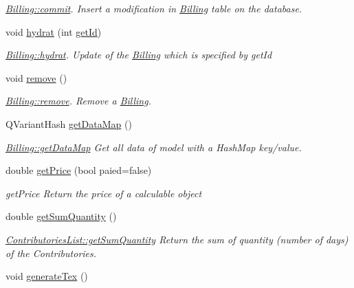\begin{DoxyCompactItemize}
\begin{DoxyCompactList}\small\item\em \hyperlink{classModels_1_1Billing_ad2280a0d8dde4c36e88c344b01044caf}{Billing\-::commit}. Insert a modification in \hyperlink{classModels_1_1Billing}{Billing} table on the database. \end{DoxyCompactList}\item 
void \hyperlink{classModels_1_1Billing_a689643008955fdcd5833631a6202c0dc}{hydrat} (int \hyperlink{classModels_1_1IModel_a63087bb34da8c38a11109cd775122d31}{get\-Id})
\begin{DoxyCompactList}\small\item\em \hyperlink{classModels_1_1Billing_a689643008955fdcd5833631a6202c0dc}{Billing\-::hydrat}. Update of the \hyperlink{classModels_1_1Billing}{Billing} which is specified by {\itshape get\-Id} \end{DoxyCompactList}\item 
\hypertarget{classModels_1_1Billing_ada8a7c127a80fa7349fbd6a7d30ca4a3}{void \hyperlink{classModels_1_1Billing_ada8a7c127a80fa7349fbd6a7d30ca4a3}{remove} ()}\label{classModels_1_1Billing_ada8a7c127a80fa7349fbd6a7d30ca4a3}

\begin{DoxyCompactList}\small\item\em \hyperlink{classModels_1_1Billing_ada8a7c127a80fa7349fbd6a7d30ca4a3}{Billing\-::remove}. Remove a \hyperlink{classModels_1_1Billing}{Billing}. \end{DoxyCompactList}\item 
Q\-Variant\-Hash \hyperlink{classModels_1_1Billing_a2363c0b978434c0a835f894a67eb81e1}{get\-Data\-Map} ()
\begin{DoxyCompactList}\small\item\em \hyperlink{classModels_1_1Billing_a2363c0b978434c0a835f894a67eb81e1}{Billing\-::get\-Data\-Map} Get all data of model with a Hash\-Map key/value. \end{DoxyCompactList}\item 
double \hyperlink{classModels_1_1Billing_a866e81394fa11dce7dc4ab7bfc53ed79}{get\-Price} (bool paied=false)
\begin{DoxyCompactList}\small\item\em get\-Price Return the price of a calculable object \end{DoxyCompactList}\item 
double \hyperlink{classModels_1_1Billing_a360006189d4867e3281009b0c465bc53}{get\-Sum\-Quantity} ()
\begin{DoxyCompactList}\small\item\em \hyperlink{classModels_1_1ContributoriesList_af9b3b1b703cebeef552d058999ffcc4c}{Contributories\-List\-::get\-Sum\-Quantity} Return the sum of quantity (number of days) of the Contributories. \end{DoxyCompactList}\item 
\hypertarget{classModels_1_1Billing_a3f835c6f4ea0b66c43bb7fec40c6e075}{void \hyperlink{classModels_1_1Billing_a3f835c6f4ea0b66c43bb7fec40c6e075}{generate\-Tex} ()}\label{classModels_1_1Billing_a3f835c6f4ea0b66c43bb7fec40c6e075}


\end{DoxyCompactItemize}
